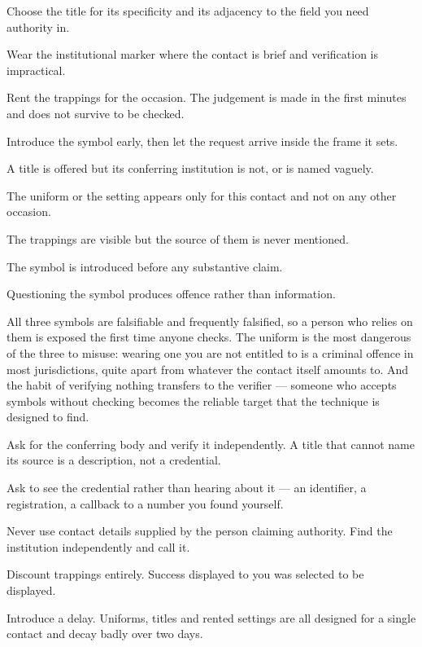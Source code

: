 \begin{application}
  \item Choose the title for its specificity and its adjacency to the field you need authority in.
  \item Wear the institutional marker where the contact is brief and verification is impractical.
  \item Rent the trappings for the occasion. The judgement is made in the first minutes and does not survive to be checked.
  \item Introduce the symbol early, then let the request arrive inside the frame it sets.
\end{application}

\begin{feedback}
  \item A title is offered but its conferring institution is not, or is named vaguely.
  \item The uniform or the setting appears only for this contact and not on any other occasion.
  \item The trappings are visible but the source of them is never mentioned.
  \item The symbol is introduced before any substantive claim.
  \item Questioning the symbol produces offence rather than information.
\end{feedback}

\begin{failure}
All three symbols are falsifiable and frequently falsified, so a person who relies on them is exposed the first time anyone checks. The uniform is the most dangerous of the three to misuse: wearing one you are not entitled to is a criminal offence in most jurisdictions, quite apart from whatever the contact itself amounts to. And the habit of verifying nothing transfers to the verifier --- someone who accepts symbols without checking becomes the reliable target that the technique is designed to find.
\end{failure}

\begin{countermeasures}
  \item Ask for the conferring body and verify it independently. A title that cannot name its source is a description, not a credential.
  \item Ask to see the credential rather than hearing about it --- an identifier, a registration, a callback to a number you found yourself.
  \item Never use contact details supplied by the person claiming authority. Find the institution independently and call it.
  \item Discount trappings entirely. Success displayed to you was selected to be displayed.
  \item Introduce a delay. Uniforms, titles and rented settings are all designed for a single contact and decay badly over two days.
\end{countermeasures}

\seesources
{}
